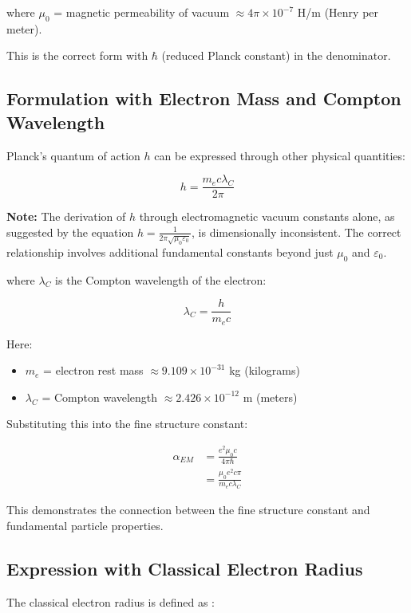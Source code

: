 \documentclass[12pt,a4paper]{article}
\begin{document}
	where $\mu_0$ = magnetic permeability of vacuum $\approx 4\pi \times 10^{-7}$ H/m (Henry per meter).
	
	This is the correct form with $\hbar$ (reduced Planck constant) in the denominator.
	
	\subsection{Formulation with Electron Mass and Compton Wavelength}
	Planck's quantum of action $h$ can be expressed through other physical quantities:
	
	\begin{equation}
		h = \frac{m_e c \lambda_C}{2\pi}
	\end{equation}
	
	\textbf{Note:} The derivation of $h$ through electromagnetic vacuum constants alone, as suggested by the equation $h = \frac{1}{2\pi\sqrt{\mu_0\varepsilon_0}}$, is dimensionally inconsistent. The correct relationship involves additional fundamental constants beyond just $\mu_0$ and $\varepsilon_0$.
	
	where $\lambda_C$ is the Compton wavelength of the electron:
	
	\begin{equation}
		\lambda_C = \frac{h}{m_e c}
	\end{equation}
	
	Here:
	\begin{itemize}
		\item $m_e$ = electron rest mass $\approx 9.109 \times 10^{-31}$ kg (kilograms)
		\item $\lambda_C$ = Compton wavelength $\approx 2.426 \times 10^{-12}$ m (meters)
	\end{itemize}
	
	Substituting this into the fine structure constant:
	
	\begin{align}
		\alpha_{EM} &= \frac{e^2\mu_0 c}{4\pi\hbar}\\
		&= \frac{\mu_0e^2 c \pi}{m_e c \lambda_C}
	\end{align}
	
	This demonstrates the connection between the fine structure constant and fundamental particle properties.
	
	\subsection{Expression with Classical Electron Radius}
	The classical electron radius is defined as \cite{Born2013}:
	
\end{document}
